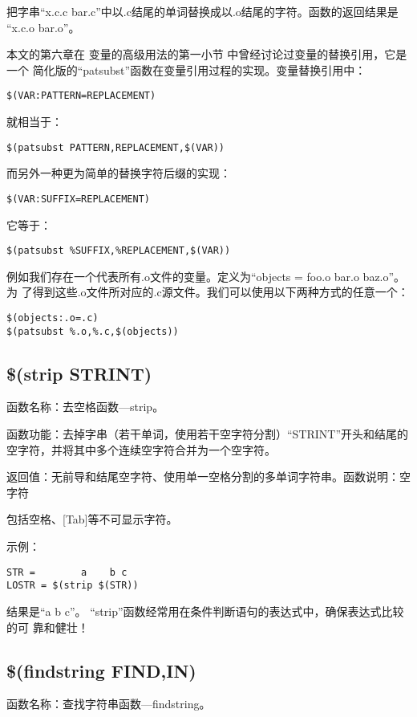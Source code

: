 把字串“x.c.c bar.c”中以.c结尾的单词替换成以.o结尾的字符。函数的返回结果是
“x.c.o bar.o”。

本文的第六章在 变量的高级用法的第一小节 中曾经讨论过变量的替换引用，它是一个
简化版的“patsubst”函数在变量引用过程的实现。变量替换引用中：
\begin{Verbatim}[]
$(VAR:PATTERN=REPLACEMENT)
\end{Verbatim}
就相当于：
\begin{Verbatim}[]
$(patsubst PATTERN,REPLACEMENT,$(VAR))
\end{Verbatim}

而另外一种更为简单的替换字符后缀的实现：
\begin{Verbatim}[]
$(VAR:SUFFIX=REPLACEMENT)
\end{Verbatim}
它等于：
\begin{Verbatim}[]
$(patsubst %SUFFIX,%REPLACEMENT,$(VAR))
\end{Verbatim}

例如我们存在一个代表所有.o文件的变量。定义为“objects = foo.o bar.o baz.o”。为
了得到这些.o文件所对应的.c源文件。我们可以使用以下两种方式的任意一个：
\begin{Verbatim}[]
$(objects:.o=.c)
$(patsubst %.o,%.c,$(objects))
\end{Verbatim}

\subsection{\$(strip STRINT)}

函数名称：去空格函数—strip。

函数功能：去掉字串（若干单词，使用若干空字符分割）“STRINT”开头和结尾的空字符，并将其中多个连续空字符合并为一个空字符。

返回值：无前导和结尾空字符、使用单一空格分割的多单词字符串。函数说明：空字符

包括空格、[Tab]等不可显示字符。

示例：

\begin{Verbatim}[]
STR =        a    b c
LOSTR = $(strip $(STR))
\end{Verbatim}

结果是“a b c”。 “strip”函数经常用在条件判断语句的表达式中，确保表达式比较的可
靠和健壮！

\subsection{\$(findstring FIND,IN)}
函数名称：查找字符串函数—findstring。

